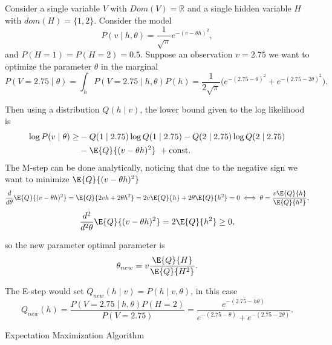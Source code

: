 \begin{exampleth}
  Consider a single variable \(V\) with \(Dom(V) = \mathbb{R}\) and a single hidden variable \(H\) with \(dom(H) = \{1,2\}\). Consider the model
  \[
    P(v \mid h, \theta) = \frac{1}{\sqrt{\pi}}e^{-(v - \theta h)^{2}},
  \]
  and \(P(H = 1) = P(H = 2) = 0.5\). Suppose an observation \(v = 2.75\) we want to optimize the parameter \(\theta\) in the marginal
  \[
    P(V = 2.75 \mid \theta) = \int_{h} P(V = 2.75 \mid h, \theta) P(h) = \frac{1}{2\sqrt{\pi}}\big( e^{-(2.75 - \theta)^{2}} + e^{-(2.75 - 2\theta)^{2}} \big).
  \]

  Then using a distribution \(Q(h \mid v)\), the lower bound given to the log likelihood is
  \[
    \begin{aligned}
      \log{P(v \mid \theta)} \geq
      & -Q(1 \mid 2.75)\log{Q(1 \mid 2.75)} - Q(2 \mid 2.75)\log{Q(2 \mid 2.75)}\\
      & - \E{Q}{(v - \theta h)^{2}}\ + \text{const.}
    \end{aligned}
  \]
  The M-step can be done analytically, noticing that due to the negative sign we want to minimize \(\E{Q}{(v - \theta h)^{2}}\)
  \[
    \frac{d}{d\theta}\E{Q}{(v - \theta h)^{2}} = \E{Q}{ 2 v h + 2\theta h^{2} } = 2v\E{Q}{h} + 2\theta \E{Q}{h^{2}} = 0 \iff \theta = \frac{v\E{Q}{h}}{\E{Q}{h^{2}}},
  \]
  \[
     \frac{d^{2}}{d^{2}\theta}\E{Q}{(v - \theta h)^{2}} = 2\E{Q}{h^{2}} \geq 0,
  \]

  so the new parameter optimal parameter is
  \[
    \theta_{new} = v \frac{\E{Q}{H}}{\E{Q}{H^{2}}}.
  \]

  The E-step would set \(Q_{new}(h \mid v) = P(h \mid v , \theta)\), in this case
  \[
    Q_{new}(h) = \frac{P(V = 2.75 \mid h, \theta)P(H = 2)}{P(V = 2.75)} = \frac{e^{-(2.75-h\theta)}}{ e^{-(2.75-\theta)} + e^{-(2.75-2\theta)}  }.
  \]
\end{exampleth}

 \begin{algorithm}[t]
  \SetAlgoLined
  \KwRet{\(\theta\)}\;
  \caption{Expectation Maximization Algorithm}\label{alg:em}
\end{algorithm}

